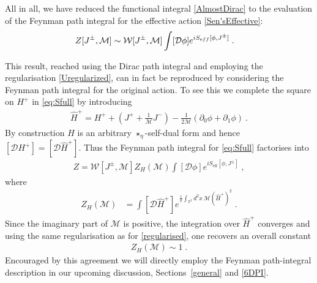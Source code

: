 \documentclass[11pt]{article}
\numberwithin{equation}{section}
\begin{document}
All in all, we have reduced the functional integral \eqref{AlmostDirac} to the evaluation of  the Feynman path integral for the effective action  \eqref{Sen'sEffective}:
\begin{align}
Z[J^\pm,\mathcal M]&\sim  \mathcal{W}[J^\pm, {\mathcal M}] \int[\mathcal D\phi]e^{i S_{\text eff}[\phi, J^\pm]}\;.
\label{EffectiveActionPathIntegral}
\end{align}

This result, reached using the Dirac path integral  and employing the regularisation \eqref{Uregularized}, can in fact be reproduced  by considering the Feynman path integral for the original action. To see this  we complete the square on $H^+$ in \eqref{eq:Sfull} by introducing
\begin{align}
\hat H^+ =  H^+ + \left(J^{+} + \frac{1}{\mathcal M} J^{-}\right) - \frac{1}{2{\mathcal M}} ( \partial_0 \phi + \partial_1 \phi)  \ . 
\end{align}
By construction $H$ is an arbitrary $\star_\eta$-self-dual form and hence $[\mathcal DH^+]=[\mathcal D\hat H^+]$. Thus the Feynman path integral for \eqref{eq:Sfull} factorises into 
\begin{align}
Z =  \mathcal{W}[J^{\pm}, {\mathcal M}] Z_H({\mathcal M})  \int [ \mathcal{D} \phi] e^{i S_{\text{eff}}[\phi,J^\pm]} \ ,
\end{align}
where  
\begin{align}
Z_H({\mathcal M}) & = \int [\mathcal{D} \hat H^+] e^{\frac{i}{\pi} \int_{\mathbb T^2} d^2 x \,  {\mathcal M} (\hat H^+)^2}\;.
\end{align}
Since the imaginary part of ${\mathcal M}$ is positive, the integration over $\hat H^+$ converges and using the same regularisation as for \eqref{regularised}, one recovers an overall constant
\begin{align}\label{Feyn}
    Z_H({\mathcal M}) \sim 1 \;.
\end{align}
 Encouraged by this agreement we will directly employ the Feynman path-integral description in our upcoming discussion, Sections~\ref{general} and \ref{6DPI}.
\end{document}
